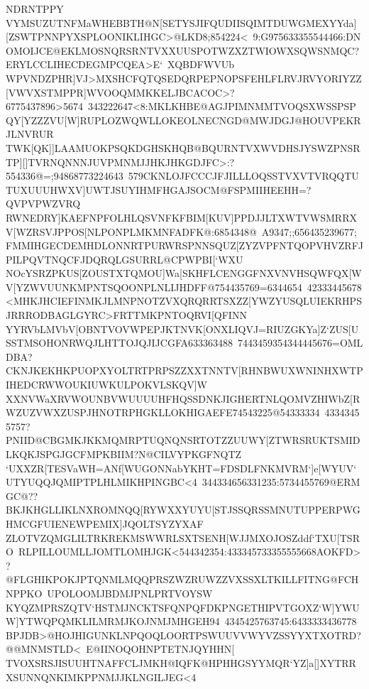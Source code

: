 {{{ NDRNTPPY}
 \hbox{VYMSUZUTNFMaWHEBBTH@N[SETYSJIFQUDIISQIMTDUWGMEXYYda][ZSWTPNNPYXSPLOONIKLIHGC>@LKD8;854224<%
 9:G975633355544466:DNOMOIJCE@EKLMOSNQRSRNTVXXUUSPOTWZXZTWIOWXSQWSNMQC?ERYLCCLIHECDEGMPCQEA>E`%
 XQBDFWVUb}
 \hbox{WPVNDZPHR]VJ>MXSHCFQTQSEDQRPEPNOPSFEHLFLRVJRVYORIYZZ[VWVXSTMPPR]WVOOQMMKKELJBCACOC>?6775437896>5674%
 343222647<8:MKLKHBE@AGJPIMNMMTVOQSXWSSPSPQY[YZZZVU[W]RUPLOZWQWLLOKEOLNECNGD@MWJDGJ@HOUVPEKRJLNVRUR}
 \hbox{TWK[QK]]LAAMUOKPSQKDGHSKHQB@BQURNTVXWVDHSJYSWZPNSRTP][]TVRNQNNNJUVPMNMJJHKJHKGDJFC>:?554336@=;94868773224643%
 579CKNLOJFCCCJFJILLLOQSSTVXVTVRQQTUTUXUUUHWXV]UWTJSUYIHMFHGAJSOCM@FSPMIIHEEHH=?QVPVPWZVRQ}
 \hbox{RWNEDRY]KAEFNPFOLHLQSVNFKFBIM[KUV]PPDJJLTXWTVWSMRRXV[WZRSVJPPOS[NLPONPLMKMNFADFK@:6854348@%
 A9347;;656435239677;FMMIHGECDEMHDLONNRTPURWRSPNNSQUZ[ZYZVPFNTQOPVHVZRFJPILPQVTNQCFJDQRQLGSURRL@CPWPBI[`WXU}
 \hbox{NOcYSRZPKUS[ZOUSTXTQMOU]Wa[SKHFLCENGGFNXVNVHSQWFQX[WV[YZWVUUNKMPNTSQOONPLNLIJHDFF@754435769=6344654%
 42333445678<MHKJHCIEFINMKJLMNPNOTZVXQRQRRTSXZZ[YWZYUSQLUIEKRHPSJRRRODBAGLGYRC>FRTTMKPNTOQRVI[QFINN}
 \hbox{YYRVbLMVbV[OBNTVOVWPEPJKTNVK[ONXLIQVJ=RIUZGKYa]Z`ZUS[USSTMSOHONRWQJLHTTOJQJIJCGFA633363488%
 7443459354344445676=OMLDBA?CKNJKEKHKPUOPXYOLTRTPRPSZZXXTNNTV[RHNBWUXWNINHXWTPIHEDCRWWOUKIUWKULPOKVLSKQV]W%
 }
 \hbox{XXNVWaXRVWOUNBVWUUUUHFHQSSDNKJIGHERTNLQOMVZHIWbZ[RWZUZVWXZUSPJHNOTRPHGKLLOKHIGAEFE74543225@54333334%
 43343455757?PNIID@CBGMKJKKMQMRPTUQNQNSRTOTZZUUWY[ZTWRSRUKTSMIDLKQKJSPGJGCFMPKBIIM?N@CILVYPKGFNQTZ}
 \hbox{`UXXZR[TESVaWH=ANf[WUGONNabYKHT=FDSDLFNKMVRM`]e[WYUV`UTYUQQJQMIPTPLHLMIKHPINGBC<4%
 344334656331235:5734455769@ERMGC@??BKJKHGLLIKLNXROMNQQ[RYWXXYUYU[STJSSQRSSMNUTUPPERPWGHMCGFUIENEWPEMIX]JQOLTSYZYXAF}
 \hbox{ZLOTVZQMGLILTRKREKMSWWRLSXTSENH[WJJMXOJOSZddf`TXU[TSRO%
 RLPILLOUMLLJOMTLOMHJGK<544342354:433345733355555668AOKFD>?@FLGHIKPOKJPTQNMLMQQPRSZWZRUWZZVXSSXLTKILLFITNG@FCHNPPKO%
 UPOLOOMJBDMJPNLPRTVOYSW}
 \hbox{KYQZMPRSZQTV`HSTMJNCKTSFQNPQFDKPNGETHIPVTGOXZ`W]YWUW]YTWQPQMKLILMRMJKOJNMJMHGEH94%
 4345425763745:6433333436778BPJDB>@HOJHIGUNKLNPQOQLOORTPSWUUVVWYVZSSYYXTXOTRD?@@MNMSTLD<%
 E@IINOQOHNPTETNJQYHHN[}
 \hbox{TVOXSRSJISUUHTNAFFCLJMKH@IQFK@HPHHGSYYMQR`YZ]a[]XYTRRXSUNNQNKIMKPPNMJJKLNGILJEG<4%
}}}

